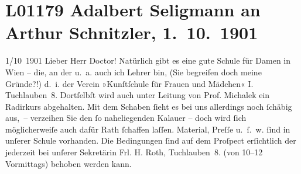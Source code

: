 

\section[Adalbert Seligmann an Arthur Schnitzler, 1. 10. 1901]{L01179 Adalbert Seligmann an Arthur Schnitzler, 1. 10. 1901}
\nopagebreak{}
\rehead{ }\normalsize\beginnumbering{}
\toendnotes[C]{\smallbreak\pagebreak[2]}
\toendnotes[C]{\smallbreak}
\pstart
           \raggedleft{}{\pb}1/10 1901\pend
           \vspace{0.5em}
\pstart
           Lieber Herr Doctor! Natürlich gibt es eine gute Schule für Damen in
                  Wien – die, an der u. a. auch ich Lehrer bin,
               (Sie begreifen doch meine Gründe?!) d. i. der Verein »Kunſtſchule für Frauen und Mädchen« I.
                  Tuchlauben 8. Dortſelbſt wird auch unter Leitung von Prof. Michalek ein Radirkurs abgehalten. Mit dem Schaben{ }ſieht es
               bei uns allerdings noch{ }ſchäbig aus, – verzeihen Sie den{ }ſo {\pb}naheliegenden Kalauer – doch wird{ }ſich
               möglicherweiſe auch dafür Rath{ }ſchaffen laſſen. Material, Preſſe u. ſ. w.{ }ſind in
               unſerer Schule vorhanden. Die Bedingungen{ }ſind auf dem Proſpect erſichtlich der
               jederzeit bei unſerer Sekretärin Frl. H. Roth,
               Tuchlauben 8. (von 10–12 Vormittags) behoben
               werden kann.\pend
           
